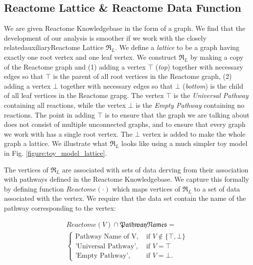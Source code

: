 \documentclass{article}
\begin{document}
\subsection{Reactome Lattice \& Reactome Data Function}

We are given Reactome Knowledgebase in the form of a graph. We find that the development of our analysis is smoother if we work with the closely related\textemdash auxiliary\textemdash Reactome Lattice $\mathfrak R_L$. We define a \textit{lattice} to be a graph having exactly one root vertex and one leaf vertex. We construct $\mathfrak R_L$ by making a copy of the Reactome graph and (1) adding a vertex $\top$ (\textit{top}) together with necessary edges so that $\top$ is the parent of all root vertices in the Reactome graph, (2) adding a vertex $\bot$ together with necessary edges so that $\bot$ (\textit{bottom}) is the child of all leaf vertices in the Reactome grapg. The vertex $\top$ is the \textit{Universal Pathway} containing all reactions, while the vertex $\bot$ is the \textit{Empty Pathway} containing no reactions. The point in adding $\top$ is to ensure that the graph we are talking about does not consist of multiple unconnected graphs, and to ensure that every graph we work with has a single root vertex. The $\bot$ vertex is added to make the whole graph a lattice. We illustrate what $\mathfrak R_L$ looks like using a much simpler toy model in Fig. \ref{figure:toy_model_lattice}.

The vertices of $\mathfrak R_L$ are associated with sets of data derving from their association with pathways defined in the Reactome Knowledgebase. We capture this formally by defining function $Reactome(\cdot)$ which maps vertices of $\mathfrak R_L$ to a set of data associated with the vertex. We require that the data set contain the name of the pathway corresponding to the vertex:

\begin{equation}
	\begin{aligned}
		Reactome(V) \cap \mathfrak{PathwayNames} = \\
		\begin{cases}
			\text{Pathway Name of V}, & \text{ if $V \notin \{\top, \bot\}$} \\
			\text{'Universal Pathway'}, & \text{ if $V = \top$} \\
			\text{'Empty Pathway'}, & \text{ if $V = \bot$}.
		\end{cases}
	\end{aligned}
\end{equation}
\end{document}
